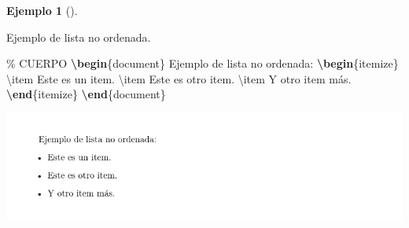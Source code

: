 \documentclass[
  a4paper,
]{scrreport}
\newenvironment{Shaded}{\begin{snugshade}}{\end{snugshade}}
\newcommand{\CommentTok}[1]{\textcolor[rgb]{0.37,0.37,0.37}{#1}}
\newcommand{\ExtensionTok}[1]{\textcolor[rgb]{0.00,0.23,0.31}{#1}}
\newcommand{\FunctionTok}[1]{\textcolor[rgb]{0.28,0.35,0.67}{#1}}
\newcommand{\KeywordTok}[1]{\textcolor[rgb]{0.00,0.23,0.31}{\textbf{#1}}}
\newcommand{\NormalTok}[1]{\textcolor[rgb]{0.00,0.23,0.31}{#1}}
\theoremstyle{definition}
\newtheorem{example}{Ejemplo}[chapter]
\theoremstyle{remark}
\begin{document}
\begin{example}[]\protect\hypertarget{exm-lista-no-ordenada}{}\label{exm-lista-no-ordenada}

Ejemplo de lista no ordenada.

\begin{Shaded}
\begin{Highlighting}[]
\CommentTok{\% CUERPO}
\KeywordTok{\textbackslash{}begin}\NormalTok{\{}\ExtensionTok{document}\NormalTok{\}}
\NormalTok{Ejemplo de lista no ordenada:}
\KeywordTok{\textbackslash{}begin}\NormalTok{\{}\ExtensionTok{itemize}\NormalTok{\}}
\FunctionTok{\textbackslash{}item}\NormalTok{ Este es un item.}
\FunctionTok{\textbackslash{}item}\NormalTok{ Este es otro item.}
\FunctionTok{\textbackslash{}item}\NormalTok{ Y otro item más.}
\KeywordTok{\textbackslash{}end}\NormalTok{\{}\ExtensionTok{itemize}\NormalTok{\}}
\KeywordTok{\textbackslash{}end}\NormalTok{\{}\ExtensionTok{document}\NormalTok{\}}
\end{Highlighting}
\end{Shaded}

\begin{tcolorbox}[enhanced jigsaw, colframe=quarto-callout-note-color-frame, opacityback=0, title={Salida}, bottomrule=.15mm, left=2mm, coltitle=black, arc=.35mm, leftrule=.75mm, colback=white, rightrule=.15mm, colbacktitle=quarto-callout-note-color!10!white, toprule=.15mm, breakable, opacitybacktitle=0.6, bottomtitle=1mm, toptitle=1mm, titlerule=0mm]

\includegraphics{img/listas/lista-no-ordenad.png}

\end{tcolorbox}

\end{example}
\end{document}
